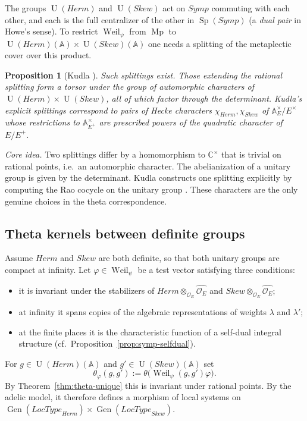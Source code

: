 \documentclass[11pt]{amsart}
\newtheorem{proposition}[theorem]{Proposition}
\theoremstyle{definition}
\theoremstyle{remark}
\newcommand{\OEring}{\mathcal{O}_E}
\newcommand{\Herm}{\mathit{Herm}}
\newcommand{\Skew}{\mathit{Skew}}
\newcommand{\Symp}{\mathit{Symp}}
\newcommand{\LocType}{\mathit{LocType}}
\DeclareMathOperator{\Gen}{Gen}
\DeclareMathOperator{\Sp}{Sp}
\DeclareMathOperator{\Mp}{Mp}
\DeclareMathOperator{\U}{U}
\DeclareMathOperator{\Weil}{Weil}
\newcommand{\A}{\mathbb{A}}
\newcommand{\C}{\mathbb{C}}
\begin{document}
The groups $\U(\Herm)$ and $\U(\Skew)$ act on $\Symp$ commuting with each other, and each is the full centralizer of the other in $\Sp(\Symp)$ (a \emph{dual pair} in Howe's sense). To restrict $\Weil_\psi$ from $\Mp$ to $\U(\Herm)(\A)\times\U(\Skew)(\A)$ one needs a splitting of the metaplectic cover over this product.

\begin{proposition}[Kudla \cite{Kudla-splitting}]\label{prop:kudla}
Such splittings exist. Those extending the rational splitting form a torsor under the group of automorphic characters of $\U(\Herm)\times\U(\Skew)$, all of which factor through the determinant. Kudla's explicit splittings correspond to pairs of Hecke characters $\chi_{\Herm},\chi_{\Skew}$ of $\A_E^\times/E^\times$ whose restrictions to $\A_{E^+}^\times$ are prescribed powers of the quadratic character of $E/E^+$.
\end{proposition}

\noindent\emph{Core idea.} Two splittings differ by a homomorphism to $\C^\times$ that is trivial on rational points, i.e.\ an automorphic character. The abelianization of a unitary group is given by the determinant. Kudla constructs one splitting explicitly by computing the Rao cocycle on the unitary group \cite{Kudla-splitting}. These characters are the only genuine choices in the theta correspondence.

\subsection{Theta kernels between definite groups}\label{subsec:theta-kernel}
Assume $\Herm$ and $\Skew$ are both definite, so that both unitary groups are compact at infinity. Let $\varphi\in\Weil_\psi$ be a test vector satisfying three conditions:
\begin{itemize}
\item it is invariant under the stabilizers of $\Herm\otimes_{\OEring}\widehat{\OEring}$ and $\Skew\otimes_{\OEring}\widehat{\OEring}$;
\item at infinity it spans copies of the algebraic representations of weights $\lambda$ and $\lambda'$;
\item at the finite places it is the characteristic function of a self-dual integral structure (cf.\ Proposition~\ref{prop:symp-selfdual}).
\end{itemize}
For $g\in\U(\Herm)(\A)$ and $g'\in\U(\Skew)(\A)$ set
\[
\theta_\varphi(g,g'):=\theta\bigl(\Weil_\psi(g,g')\varphi\bigr).
\]
By Theorem~\ref{thm:theta-unique} this is invariant under rational points. By the adelic model, it therefore defines a morphism of local systems on $\Gen(\LocType_{\Herm})\times\Gen(\LocType_{\Skew})$.
\end{document}
